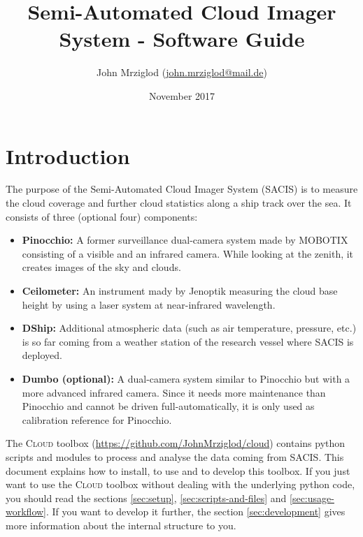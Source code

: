 \documentclass[11pt,a4paper]{article}
\begin{document}
\title{Semi-Automated Cloud Imager System - Software Guide}
\author{John Mrziglod (\href{mailto:john.mrziglod@mail.de}{john.mrziglod@mail.de})}
\date{November 2017}
\maketitle

\newcommand{\cloud}{\textsc{Cloud} }
\newcommand{\config}[2]{\texttt{[#1][#2]}}

\tableofcontents

\section{Introduction}
The purpose of the Semi-Automated Cloud Imager System (SACIS) is to measure the cloud coverage and further cloud statistics along a ship track over the sea. It consists of three (optional four) components:

\begin{itemize}
	\item \textbf{Pinocchio:} A former surveillance dual-camera system made by MOBOTIX consisting of a visible and an infrared camera. While looking at the zenith, it creates images of the sky and clouds.
	\item \textbf{Ceilometer:} An instrument mady by Jenoptik measuring the cloud base height by using a laser system at near-infrared wavelength.
	\item \textbf{DShip:} Additional atmospheric data (such as air temperature, pressure, etc.) is so far coming from a weather station of the research vessel where SACIS is deployed.
	\item \textbf{Dumbo (optional):} A dual-camera system similar to Pinocchio but with a more advanced infrared camera. Since it needs more maintenance than Pinocchio and cannot be driven full-automatically, it is only used as calibration reference for Pinocchio.
\end{itemize}

The \cloud toolbox (\url{https://github.com/JohnMrziglod/cloud}) contains python scripts and modules to process and analyse the data coming from SACIS. This document explains how to install, to use and to develop this toolbox. If you just want to use the \cloud toolbox without dealing with the underlying python code, you should read the sections \ref{sec:setup}, \ref{sec:scripts-and-files} and \ref{sec:usage-workflow}. If you want to develop it further, the section \ref{sec:development} gives more information about the internal structure to you.
\end{document}
